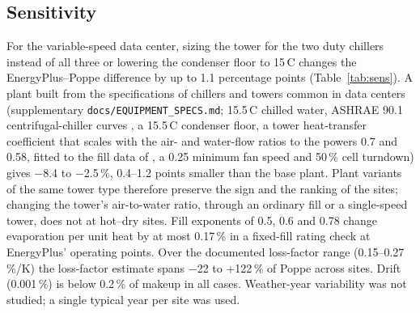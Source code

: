 \documentclass[preprint,12pt]{elsarticle}
\begin{document}
\subsection{Sensitivity}\label{sec:sensitivity}
For the variable-speed data center, sizing the tower for the two duty chillers instead of all three or lowering the condenser floor to
15\,\textdegree C changes the EnergyPlus--Poppe difference by up to 1.1 percentage points (Table~\ref{tab:sens}). A plant
built from the specifications of chillers and towers common in data centers (supplementary \texttt{docs/EQUIPMENT\_SPECS.md};
15.5\,\textdegree C chilled water, ASHRAE 90.1 centrifugal-chiller curves \citep{ashrae2019addendumbd}, a 15.5\,\textdegree C
condenser floor, a tower heat-transfer coefficient that scales with the air- and water-flow ratios to the powers 0.7 and
0.58, fitted to the fill data of \citet{kloppers2003critical}, a 0.25 minimum
fan speed and 50\,\% cell turndown) gives $-$8.4 to $-$2.5\,\%, 0.4--1.2 points smaller than the base plant. Plant variants of
the same tower type therefore preserve the sign and the ranking of the sites; changing the tower's air-to-water ratio,
through an ordinary fill or a single-speed tower, does not at hot--dry sites. Fill exponents of 0.5, 0.6 and 0.78 change
evaporation per unit heat by at most 0.17\,\% in a fixed-fill rating check at EnergyPlus' operating points. Over the
documented loss-factor range (0.15--0.27\,\%/K) the loss-factor estimate spans $-$22 to +122\,\% of Poppe across sites. Drift
(0.001\,\%) is below 0.2\,\% of makeup in all cases. Weather-year variability was not studied; a single typical year per site
was used.

\begin{table}[t]\centering\small
\caption{Variable-speed data center: EnergyPlus saturated exit vs Poppe annual evaporation [\%] for plant variants.
$^a$15.5\,\textdegree C chilled water and condenser floor, ASHRAE 90.1 chiller curves, fill-data heat-transfer curves, 0.25 minimum fan
speed, 50\,\% cell turndown. $^b$Same simulations as the base plant, tower replaced by an ordinary fill
(Section~\ref{sec:consistency}); hours the ordinary tower cannot meet are excluded. Variants with ``--'' were run only at
the four sites shown.}\label{tab:sens}

\end{table}
\end{document}
